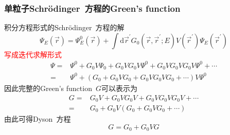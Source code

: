 \documentclass[cjk,slidestop,compress,mathserif,blue]{beamer}
\begin{document}
\frame
{
	\frametitle{单粒子\textrm{Schr\"odinger~}方程的\textrm{Green's function}}
	积分方程形式的\textrm{Schr\"odinger~}方程的解
	\begin{displaymath}
		\Psi_E(\vec r)=\Psi_E^0(\vec r)+\int\mathrm{d}\vec r^{\prime}G_0(\vec r,\vec r^{\prime};E)V(\vec r^{\prime})\Psi_E(\vec r^{\prime})
	\end{displaymath}
	\textcolor{red}{写成迭代求解形式}
	\begin{displaymath}
		\begin{aligned}
			\Psi=&\Psi^0+G_0V\Psi_0+G_0VG_0V\Psi^0+G_0VG_0VG_0V\Psi^0+\cdots\\
			=&\Psi^0+(G_0+G_0VG_0+G_0VG_0VG_0+\cdots)V\Psi^0
		\end{aligned}
	\end{displaymath}
	因此完整的\textrm{Green's function~}$G$可以表示为
	\begin{displaymath}
		\begin{aligned}
			G=&G_0V+G_0VG_0V+G_0VG_0VG_0V+\cdots\\
			=&G_0+G_0V(G_0+G_0VG_0+\cdots)
		\end{aligned}
	\end{displaymath}
	由此可得\textrm{Dyson~}方程
	\begin{displaymath}
		G=G_0+G_0VG
	\end{displaymath}
}
\end{document}
